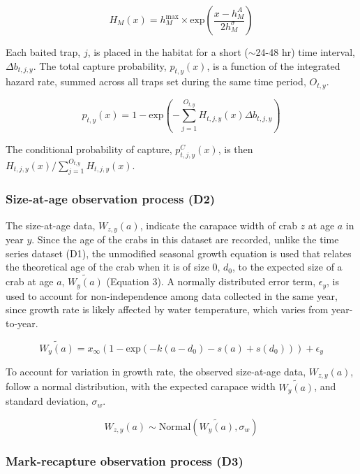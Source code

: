 \documentclass{article}
\begin{document}
\begin{equation}
H_M(x) = h^{\text{max}}_M \times \text{exp}(\frac{x-h^{A}_M}{2 h^{\sigma}_M})
\end{equation}

Each baited trap, $j$, is placed in the habitat for a short ($\sim$24-48 hr) time interval, $\Delta b_{t,j,y}$. The total capture probability, $p_{t,y}(x)$, is a function of the integrated hazard rate, summed across all traps set during the same time period, $O_{t,y}$.

\begin{equation}
p_{t,y}(x) = 1-\text{exp}\left(-\sum_{j=1}^{O_{t,y}} H_{t,j,y}(x)\Delta b_{t,j,y}\right)
\end{equation}

The conditional probability of capture, $p^C_{t,j,y}(x)$, is then $H_{t,j,y}(x)/\sum_{j=1}^{O_{t,y}}H_{t,j,y}(x)$.

\subsubsection*{Size-at-age observation process (D2)}

The size-at-age data, $W_{z,y}(a)$, indicate the carapace width of crab $z$ at age $a$ in year $y$. Since the age of the crabs in this dataset are recorded, unlike the time series dataset (D1), the unmodified seasonal growth equation is used that relates the theoretical age of the crab when it is of size 0, $d_0$, to the expected size of a crab at age $a$, $\widetilde{W_y(a)}$ (Equation 3). A normally distributed error term, $\epsilon_y$, is used to account for non-independence among data collected in the same year, since growth rate is likely affected by water temperature, which varies from year-to-year.

\begin{equation}
\widetilde{W_y(a)} = x_{\infty}(1-\text{exp}(-k(a-d_0) - s(a) + s(d_0))) + \epsilon_y
\end{equation}

To account for variation in growth rate, the observed size-at-age data, $W_{z,y}(a)$, follow a normal distribution, with the expected carapace width $\widetilde{W_y(a)}$, and standard deviation, $\sigma_{w}$.

\begin{equation}
W_{z,y}(a) \sim \text{Normal}(\widetilde{W_y(a)}, \sigma_{w})
\end{equation}

\subsubsection*{Mark-recapture observation process (D3)}
\end{document}
